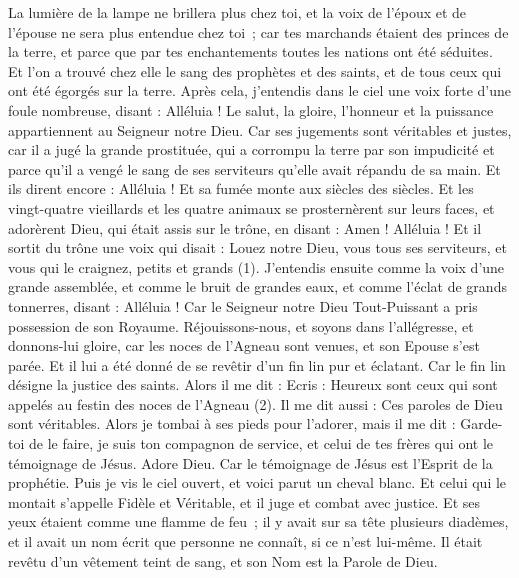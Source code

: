 \begin{multicols}{2}
La lumière de la lampe ne brillera plus chez toi, et la voix de l'époux et de l'épouse ne sera plus entendue chez toi ; car tes marchands étaient des princes de la terre, et parce que par tes enchantements toutes les nations ont été séduites.
Et l’on a trouvé chez elle le sang des prophètes et des saints, et de tous ceux qui ont été égorgés sur la terre.
\VerseOne{}Après cela, j'entendis dans le ciel une voix forte d'une foule nombreuse, disant : Alléluia ! Le salut, la gloire, l'honneur et la puissance appartiennent au Seigneur notre Dieu.
Car ses jugements sont véritables et justes, car il a jugé la grande prostituée, qui a corrompu la terre par son impudicité et parce qu'il a vengé le sang de ses serviteurs qu’elle avait répandu de sa main.
Et ils dirent encore : Alléluia ! Et sa fumée monte aux siècles des siècles.
Et les vingt-quatre vieillards et les quatre animaux se prosternèrent sur leurs faces, et adorèrent Dieu, qui était assis sur le trône, en disant : Amen ! Alléluia !
Et il sortit du trône une voix qui disait : Louez notre Dieu, vous tous ses serviteurs, et vous qui le craignez, petits et grands (1).
J'entendis ensuite comme la voix d'une grande assemblée, et comme le bruit de grandes eaux, et comme l'éclat de grands tonnerres, disant : Alléluia ! Car le Seigneur notre Dieu Tout-Puissant a pris possession de son Royaume.
Réjouissons-nous, et soyons dans l’allégresse, et donnons-lui gloire, car les noces de l'Agneau sont venues, et son Epouse s'est parée.
Et il lui a été donné de se revêtir d’un fin lin pur et éclatant. Car le fin lin désigne la justice des saints.
Alors il me dit : Ecris : Heureux sont ceux qui sont appelés au festin des noces de l'Agneau (2). Il me dit aussi : Ces paroles de Dieu sont véritables.
Alors je tombai à ses pieds pour l'adorer, mais il me dit : Garde-toi de le faire, je suis ton compagnon de service, et celui de tes frères qui ont le témoignage de Jésus. Adore Dieu. Car le témoignage de Jésus est l'Esprit de la prophétie.
Puis je vis le ciel ouvert, et voici parut un cheval blanc. Et celui qui le montait s’appelle Fidèle et Véritable, et il juge et combat avec justice.
Et ses yeux étaient comme une flamme de feu ; il y avait sur sa tête plusieurs diadèmes, et il avait un nom écrit que personne ne connaît, si ce n’est lui-même.
Il était revêtu d’un vêtement teint de sang, et son Nom est la Parole de Dieu.

\end{multicols}
